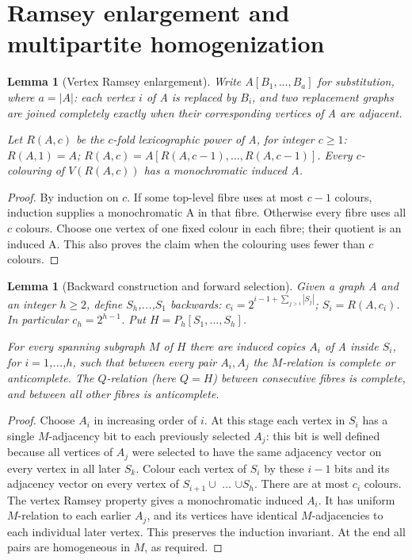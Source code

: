 \documentclass[11pt,a4paper]{article}
\newtheorem{lemma}[theorem]{Lemma}
\theoremstyle{definition}
\theoremstyle{remark}
\numberwithin{equation}{section}
\begin{document}
\section{Ramsey enlargement and multipartite homogenization}\label{sec:ramsey}
\begin{lemma}[Vertex Ramsey enlargement]\label{lem:ramsey}
Write \(A[B_{1},\allowbreak ...,\allowbreak B_{a}]\) for substitution, where \(a=|A|\): each vertex \(i\) of A is replaced by \(B_{i}\), and two replacement graphs are joined completely exactly when their corresponding vertices of A are adjacent.

Let \(R(A,\allowbreak c)\) be the \(c\)-fold lexicographic power of A, for integer \(c\ge\allowbreak 1\): \(R(A,\allowbreak 1)=A\); \(R(A,\allowbreak c)=A[R(A,\allowbreak c-1),\allowbreak ...,\allowbreak R(A,\allowbreak c-1)]\). Every \(c\)-colouring of \(V(R(A,\allowbreak c))\) has a monochromatic induced A.
\end{lemma}\begin{proof}
By induction on \(c\). If some top-level fibre uses at most \(c-1\) colours, induction supplies a monochromatic A in that fibre. Otherwise every fibre uses all \(c\) colours. Choose one vertex of one fixed colour in each fibre; their quotient is an induced A. This also proves the claim when the colouring uses fewer than \(c\) colours.
\end{proof}
\begin{lemma}[Backward construction and forward selection]\label{lem:homogenize}
Given a graph A and an integer \(h\ge\allowbreak 2\), define \(S_{h}\),...,\(S_{1}\) backwards: \(c_{i} = 2^{i-1 + \sum _{j>i}|S_{j}|}\); \(S_{i} = R(A,\allowbreak c_{i})\). In particular \(c_{h}=2^{h-1}\). Put \(H = P_{h}[S_{1},\allowbreak ...,\allowbreak S_{h}]\).

For every spanning subgraph \(M\) of \(H\) there are induced copies \(A_{i}\) of A inside \(S_{i}\), for \(i=1\),...,\(h\), such that between every pair \(A_{i},\allowbreak A_{j}\) the \(M\)-relation is complete or anticomplete. The \(Q\)-relation (here \(Q=H\)) between consecutive fibres is complete, and between all other fibres is anticomplete.
\end{lemma}\begin{proof}
Choose \(A_{i}\) in increasing order of \(i\). At this stage each vertex in \(S_{i}\) has a single \(M\)-adjacency bit to each previously selected \(A_{j}\): this bit is well defined because all vertices of \(A_{j}\) were selected to have the same adjacency vector on every vertex in all later \(S_{k}\). Colour each vertex of \(S_{i}\) by these \(i-1\) bits and its adjacency vector on every vertex of \(S_{i+1} \cup \) ... \(\cup  S_{h}\). There are at most \(c_{i}\) colours. The vertex Ramsey property gives a monochromatic induced \(A_{i}\). It has uniform \(M\)-relation to each earlier \(A_{j}\), and its vertices have identical \(M\)-adjacencies to each individual later vertex. This preserves the induction invariant. At the end all pairs are homogeneous in \(M\), as required.


\end{proof}
\end{document}
